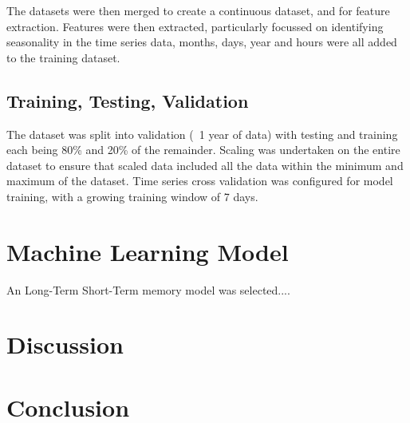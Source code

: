 \documentclass[a4paper,fleqn]{cas-sc}
\begin{document}
The datasets were then merged to create a continuous dataset, and for feature extraction. Features were then extracted, particularly focussed on identifying seasonality in the time series data, months, days, year and hours were all added to the training dataset. 

\subsection{Training, Testing, Validation}
The dataset was split into validation (~1 year of data) with testing and training each being 80\% and 20\% of the remainder. Scaling was undertaken on the entire dataset to ensure that scaled data included all the data within the minimum and maximum of the dataset. 
Time series cross validation was configured for model training, with a growing training window of 7 days.

\section{Machine Learning Model}
An Long-Term Short-Term memory model was selected....

\section{Discussion}\label{disc}


\section{Conclusion}\label{con}




\end{document}
